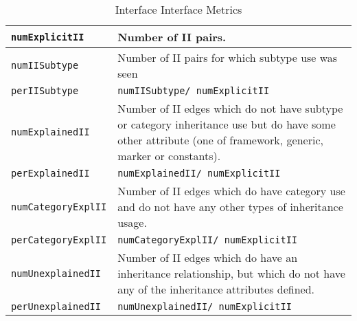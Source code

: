 \documentclass{uvamscse}
\begin{document}
\begin{table} [h!]
\begin{flushleft}
\begin{tabular}[c]{| p{40mm} | p{110mm} |}
  \hline
  \texttt{numExplicitII} &  Number of II pairs.\\
  \hline  
  \texttt{numIISubtype} &  Number of II pairs for which subtype use was seen \\
  \texttt{perIISubtype} &  \texttt{numIISubtype/ numExplicitII} \\
  \hline
  \texttt{numExplainedII} & Number of II edges which do not have subtype or category inheritance use but do have some other attribute (one of framework, generic, marker or constants). \\
  \texttt{perExplainedII} & 	\texttt{numExplainedII/ numExplicitII} \\
  \hline 
  \texttt{numCategoryExplII} & Number of II edges which do have category use and do not have any other types of inheritance usage. \\
  \texttt{perCategoryExplII} & 	\texttt{numCategoryExplII/ numExplicitII} \\
  \hline 
  \texttt{numUnexplainedII} & Number of II edges which do have an inheritance relationship, but which do not have any of the inheritance attributes defined. \\
  \texttt{perUnexplainedII} & 	\texttt{numUnexplainedII/ numExplicitII} \\
  \hline 
\end{tabular}
\end{flushleft}
\caption{Interface Interface Metrics}
\label{table:IIMetrics}
\end{table}
\end{document}
